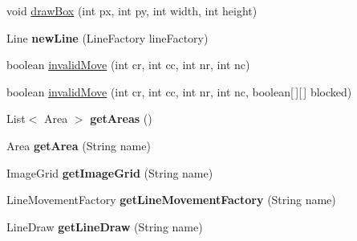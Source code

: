 \begin{DoxyCompactItemize}
\item 
void \hyperlink{classdev_1_1boxy_1_1fortyfive_1_1core_1_1scene_1_1_scene_ada15c4172e056788126d5bbc9816e603}{drawBox} (int px, int py, int width, int height)
\item 
\hypertarget{classdev_1_1boxy_1_1fortyfive_1_1core_1_1scene_1_1_scene_ab648939e09da84d9cadd6561ae275e44}{
Line {\bfseries newLine} (LineFactory lineFactory)}
\label{d6/d2d/classdev_1_1boxy_1_1fortyfive_1_1core_1_1scene_1_1_scene_ab648939e09da84d9cadd6561ae275e44}

\item 
boolean \hyperlink{classdev_1_1boxy_1_1fortyfive_1_1core_1_1scene_1_1_scene_a332e6643c967fbffde150d0bdb6333a2}{invalidMove} (int cr, int cc, int nr, int nc)
\item 
boolean \hyperlink{classdev_1_1boxy_1_1fortyfive_1_1core_1_1scene_1_1_scene_a0417319d8ee634ce7e9fb1da25bfc127}{invalidMove} (int cr, int cc, int nr, int nc, boolean\mbox{[}$\,$\mbox{]}\mbox{[}$\,$\mbox{]} blocked)
\item 
\hypertarget{classdev_1_1boxy_1_1fortyfive_1_1core_1_1scene_1_1_scene_ab4ebe80455abb07dd407c83ea6469222}{
List$<$ Area $>$ {\bfseries getAreas} ()}
\label{d6/d2d/classdev_1_1boxy_1_1fortyfive_1_1core_1_1scene_1_1_scene_ab4ebe80455abb07dd407c83ea6469222}

\item 
\hypertarget{classdev_1_1boxy_1_1fortyfive_1_1core_1_1scene_1_1_scene_a7a585b1dfe4fab8cbb797131fbcc3901}{
Area {\bfseries getArea} (String name)}
\label{d6/d2d/classdev_1_1boxy_1_1fortyfive_1_1core_1_1scene_1_1_scene_a7a585b1dfe4fab8cbb797131fbcc3901}

\item 
\hypertarget{classdev_1_1boxy_1_1fortyfive_1_1core_1_1scene_1_1_scene_a904e77dd67f6d2637481cf29ff03c736}{
ImageGrid {\bfseries getImageGrid} (String name)}
\label{d6/d2d/classdev_1_1boxy_1_1fortyfive_1_1core_1_1scene_1_1_scene_a904e77dd67f6d2637481cf29ff03c736}

\item 
\hypertarget{classdev_1_1boxy_1_1fortyfive_1_1core_1_1scene_1_1_scene_a1ff408d37e9acd50fa89701febc84a75}{
LineMovementFactory {\bfseries getLineMovementFactory} (String name)}
\label{d6/d2d/classdev_1_1boxy_1_1fortyfive_1_1core_1_1scene_1_1_scene_a1ff408d37e9acd50fa89701febc84a75}

\item 
\hypertarget{classdev_1_1boxy_1_1fortyfive_1_1core_1_1scene_1_1_scene_a1adb365ed20c63c26fa782f378c34397}{
LineDraw {\bfseries getLineDraw} (String name)}
\label{d6/d2d/classdev_1_1boxy_1_1fortyfive_1_1core_1_1scene_1_1_scene_a1adb365ed20c63c26fa782f378c34397}


\end{DoxyCompactItemize}
